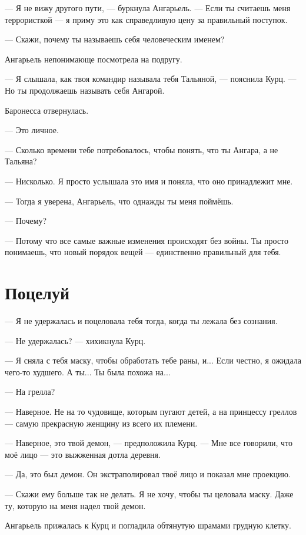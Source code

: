 \documentclass[a4paper,12pt,fleqn]{book}\usepackage{cooltooltips}\usepackage{polyglossia}\setdefaultlanguage[babelshorthands=true]{russian}\setotherlanguage{english}\defaultfontfeatures{Ligatures=TeX,Mapping=tex-text} \usepackage{xcolor}\definecolor{lightgray}{HTML}{bbbbbb}\color{lightgray}\newcommand{\ml}[3]{\textenglish{\textcolor{black}{#3}}}
\begin{document}
--- Я не вижу другого пути, --- буркнула Ангарьель.
--- Если ты считаешь меня террористкой --- я приму это как справедливую цену за правильный поступок.

--- Скажи, почему ты называешь себя человеческим именем?

Ангарьель непонимающе посмотрела на подругу.

--- Я слышала, как твоя командир называла тебя Тальяной, --- пояснила Курц.
--- Но ты продолжаешь называть себя Ангарой.

Баронесса отвернулась.

--- Это личное.

--- Сколько времени тебе потребовалось, чтобы понять, что ты Ангара, а не Тальяна?

--- Нисколько.
Я просто услышала это имя и поняла, что оно принадлежит мне.

--- Тогда я уверена, Ангарьель, что однажды ты меня поймёшь.

--- Почему?

--- Потому что все самые важные изменения происходят без войны.
Ты просто понимаешь, что новый порядок вещей --- единственно правильный для тебя.

\section{Поцелуй}

--- Я не удержалась и поцеловала тебя тогда, когда ты лежала без сознания.

--- Не удержалась? --- хихикнула Курц.

--- Я сняла с тебя маску, чтобы обработать тебе раны, и...
Если честно, я ожидала чего-то худшего.
А ты...
Ты была похожа на...

--- На грелла?

--- Наверное.
Не на то чудовище, которым пугают детей, а на принцессу греллов --- самую прекрасную женщину из всего их племени.

--- Наверное, это твой демон, --- предположила Курц.
--- Мне все говорили, что моё лицо --- это выжженная дотла деревня.

--- Да, это был демон.
Он экстраполировал твоё лицо и показал мне проекцию.

--- Скажи ему больше так не делать.
Я не хочу, чтобы ты целовала маску.
Даже ту, которую на меня надел твой демон.

Ангарьель прижалась к Курц и погладила обтянутую шрамами грудную клетку.
\end{document}
